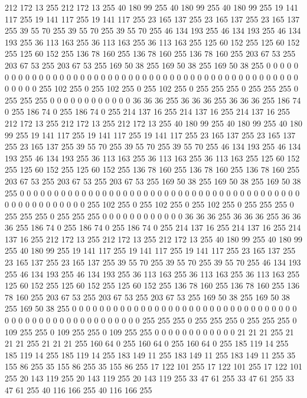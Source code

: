 212 172 13 255 212 172 13 255 40 180 99 255 40 180 99 255 40 180 99 255 19 141 117 255 19 141 117 255 19 141 117 255 23 165 137 255 23 165 137 255 23 165 137 255 39 55 70 255 39 55 70 255 39 55 70 255 46 134 193 255 46 134 193 255
46 134 193 255 36 113 163 255 36 113 163 255 36 113 163 255 125 60 152 255 125 60 152 255 125 60 152 255 136 78 160 255 136 78 160 255 136 78 160 255 203 67 53 255 203 67 53 255 203 67 53 255 169 50 38 255 169 50 38 255 169 50 38 255
0 0 0 0 0 0 0 0 0 0 0 0 0 0 0 0 0 0 0 0 0 0 0 0 0 0 0 0 0 0 0 0 0 0 0 0 0 0 0 0 0 0 0 0 0 0 0 0 0 0 0 0 0 255 102 255 0 255 102 255 0 255 102 255
0 255 255 255 0 255 255 255 0 255 255 255 0 0 0 0 0 0 0 0 0 0 0 0 36 36 36 255 36 36 36 255 36 36 36 255 186 74 0 255 186 74 0 255 186 74 0 255 214 137 16 255 214 137 16 255 214 137 16 255 212 172 13 255
212 172 13 255 212 172 13 255 40 180 99 255 40 180 99 255 40 180 99 255 19 141 117 255 19 141 117 255 19 141 117 255 23 165 137 255 23 165 137 255 23 165 137 255 39 55 70 255 39 55 70 255 39 55 70 255 46 134 193 255 46 134 193 255
46 134 193 255 36 113 163 255 36 113 163 255 36 113 163 255 125 60 152 255 125 60 152 255 125 60 152 255 136 78 160 255 136 78 160 255 136 78 160 255 203 67 53 255 203 67 53 255 203 67 53 255 169 50 38 255 169 50 38 255 169 50 38 255
0 0 0 0 0 0 0 0 0 0 0 0 0 0 0 0 0 0 0 0 0 0 0 0 0 0 0 0 0 0 0 0 0 0 0 0 0 0 0 0 0 0 0 0 0 0 0 0 0 0 0 0 0 255 102 255 0 255 102 255 0 255 102 255
0 255 255 255 0 255 255 255 0 255 255 255 0 0 0 0 0 0 0 0 0 0 0 0 36 36 36 255 36 36 36 255 36 36 36 255 186 74 0 255 186 74 0 255 186 74 0 255 214 137 16 255 214 137 16 255 214 137 16 255 212 172 13 255
212 172 13 255 212 172 13 255 40 180 99 255 40 180 99 255 40 180 99 255 19 141 117 255 19 141 117 255 19 141 117 255 23 165 137 255 23 165 137 255 23 165 137 255 39 55 70 255 39 55 70 255 39 55 70 255 46 134 193 255 46 134 193 255
46 134 193 255 36 113 163 255 36 113 163 255 36 113 163 255 125 60 152 255 125 60 152 255 125 60 152 255 136 78 160 255 136 78 160 255 136 78 160 255 203 67 53 255 203 67 53 255 203 67 53 255 169 50 38 255 169 50 38 255 169 50 38 255
0 0 0 0 0 0 0 0 0 0 0 0 0 0 0 0 0 0 0 0 0 0 0 0 0 0 0 0 0 0 0 0 0 0 0 0 0 0 0 0 0 0 0 0 0 0 0 0 0 0 0 0 0 255 255 255 0 255 255 255 0 255 255 255
0 109 255 255 0 109 255 255 0 109 255 255 0 0 0 0 0 0 0 0 0 0 0 0 21 21 21 255 21 21 21 255 21 21 21 255 160 64 0 255 160 64 0 255 160 64 0 255 185 119 14 255 185 119 14 255 185 119 14 255 183 149 11 255
183 149 11 255 183 149 11 255 35 155 86 255 35 155 86 255 35 155 86 255 17 122 101 255 17 122 101 255 17 122 101 255 20 143 119 255 20 143 119 255 20 143 119 255 33 47 61 255 33 47 61 255 33 47 61 255 40 116 166 255 40 116 166 255
